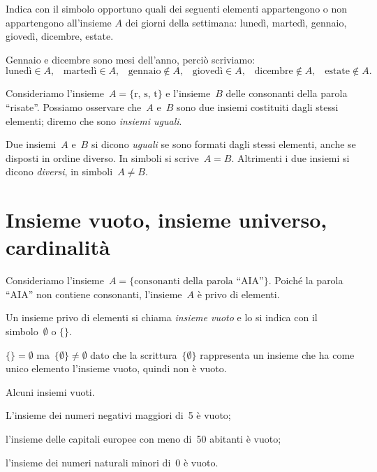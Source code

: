  \begin{exrig}
 \begin{esempio}
Indica con il simbolo opportuno quali dei seguenti elementi appartengono
o non appartengono all'insieme $A$ dei giorni della
settimana: lunedì, martedì, gennaio, giovedì, dicembre, estate.

Gennaio e dicembre sono mesi dell'anno, perciò scriviamo:
\[\text{lunedì}\in A\text{,~~~}\text{martedì}\in A\text{,~~~}\text{gennaio}\notin A\text{,~~~}\text{giovedì}\in A\text{,~~~}\text{dicembre}\notin A\text{,~~~}\text{estate}\notin A.\]
 \end{esempio}
\end{exrig}

Consideriamo l'insieme~$A=\{\text{r, s, t}\}$ e l'insieme~$B$ delle consonanti della parola
``risate''. Possiamo osservare che~$A$ e~$B$ sono due insiemi costituiti dagli stessi
elementi; diremo che sono \textit{insiemi uguali}.

\begin{definizione}
 Due insiemi~$A$ e~$B$ si dicono \emph{uguali} se sono formati dagli stessi elementi, anche se
disposti in ordine diverso. In simboli si scrive~$A=B$. Altrimenti i due insiemi si dicono \emph{diversi}, in simboli~$A\neq B$.
\end{definizione}

\ovalbox{\risolvii \ref{ese:5.2}, \ref{ese:5.3}, \ref{ese:5.4}, \ref{ese:5.5}, \ref{ese:5.6}, \ref{ese:5.7}, \ref{ese:5.8}}

\section{Insieme vuoto, insieme universo, cardinalità}\label{sect:universo}

Consideriamo l'insieme~$A=\{\text{consonanti della parola ``AIA''}\}$. Poiché la parola ``AIA'' non
contiene consonanti, l'insieme~$A$ è privo di elementi.

\begin{definizione}
 Un insieme privo di elementi si chiama \emph{insieme vuoto} e lo si indica con il simbolo~$\emptyset$ o $\{ \}$.
\end{definizione}

\osservazione $\{ \}=\emptyset$ ma~$\{\emptyset \}\neq\emptyset$ dato che la scrittura~$\{\emptyset \}$ rappresenta un insieme che ha come unico elemento l'insieme vuoto, quindi non è vuoto.
\pagebreak
\begin{exrig}
 \begin{esempio}
 Alcuni insiemi vuoti.
 \begin{enumeratea}
  \spazielenx
\item L'insieme dei numeri negativi maggiori di~5 è vuoto;
\item l'insieme delle capitali europee con meno di~50 abitanti è vuoto;
\item l'insieme dei numeri naturali minori di~0 è vuoto.
 \end{enumeratea}
 \end{esempio}
\end{exrig}

